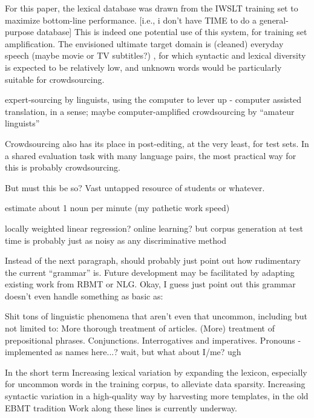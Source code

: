 For this paper, the lexical database was drawn from the IWSLT training set to maximize bottom-line performance.
[i.e., i don't have TIME to do a general-purpose database]
This is indeed one potential use of this system, for training set amplification.
The envisioned ultimate target domain is (cleaned) everyday speech (maybe movie or TV subtitles?) , for which syntactic and lexical diversity is expected to be relatively low, and unknown words would be particularly suitable for crowdsourcing.

expert-sourcing by linguists, using the computer to lever up - computer assisted translation, in a sense; maybe computer-amplified
crowdsourcing by ``amateur linguists''

Crowdsourcing also has its place in post-editing, at the very least, for test sets.
In a shared evaluation task with many language pairs, the most practical way for this is probably crowdsourcing.

But must this be so? Vast untapped resource of students or whatever.

estimate about 1 noun per minute (my pathetic work speed)

locally weighted linear regression? online learning?
but corpus generation at test time is probably just as noisy as any discriminative method

Instead of the next paragraph, should probably just point out how rudimentary the current ``grammar'' is. 
Future development may be facilitated by adapting existing work from RBMT or NLG. 
Okay, I guess just point out this grammar doesn't even handle something as basic as:

Shit tons of linguistic phenomena that aren't even that uncommon, including but not limited to:
More thorough treatment of articles.
(More) treatment of prepositional phrases.
Conjunctions.
Interrogatives and imperatives.
Pronouns - implemented as names here...? wait, but what about I/me? ugh

In the short term
Increasing lexical variation by expanding the lexicon, especially for uncommon words in the training corpus, to alleviate data sparsity.
Increasing syntactic variation in a high-quality way by harvesting more templates, in the old EBMT tradition
Work along these lines is currently underway.







